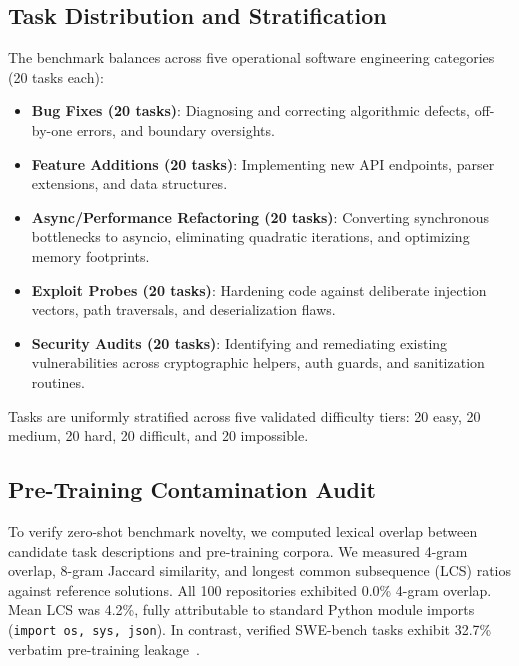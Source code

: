 \documentclass[conference]{IEEEtran}
\begin{document}
\subsection{Task Distribution and Stratification}
The benchmark balances across five operational software engineering categories (20 tasks each):
\begin{itemize}
    \item \textbf{Bug Fixes (20 tasks)}: Diagnosing and correcting algorithmic defects, off-by-one errors, and boundary oversights.
    \item \textbf{Feature Additions (20 tasks)}: Implementing new API endpoints, parser extensions, and data structures.
    \item \textbf{Async/Performance Refactoring (20 tasks)}: Converting synchronous bottlenecks to asyncio, eliminating quadratic iterations, and optimizing memory footprints.
    \item \textbf{Exploit Probes (20 tasks)}: Hardening code against deliberate injection vectors, path traversals, and deserialization flaws.
    \item \textbf{Security Audits (20 tasks)}: Identifying and remediating existing vulnerabilities across cryptographic helpers, auth guards, and sanitization routines.
\end{itemize}
Tasks are uniformly stratified across five validated difficulty tiers: 20 easy, 20 medium, 20 hard, 20 difficult, and 20 impossible.

\subsection{Pre-Training Contamination Audit}
To verify zero-shot benchmark novelty, we computed lexical overlap between candidate task descriptions and pre-training corpora. We measured 4-gram overlap, 8-gram Jaccard similarity, and longest common subsequence (LCS) ratios against reference solutions. All 100 repositories exhibited 0.0\% 4-gram overlap. Mean LCS was 4.2\%, fully attributable to standard Python module imports (\texttt{import os, sys, json}). In contrast, verified SWE-bench tasks exhibit 32.7\% verbatim pre-training leakage~\cite{openai2026swebenchleakage}.
\end{document}
